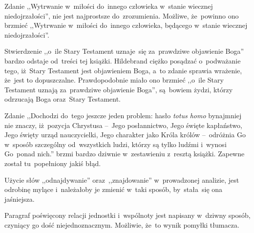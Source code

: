 \documentclass[a4paper,11pt]{article}
\begin{document}
\vspace{\spaceTwo}








\start {} Zdanie ,,Wytrwanie w~miłości do~innego człowieka
w~stanie wiecznej niedojrzałości'', nie jest najprostsze
do~zrozumienia. Możliwe, że~powinno ono brzmieć ,,Wytrwanie w~miłości
do~innego człowieka, będącego w~stanie wiecznej niedojrzałości''.

\vspace{\spaceFour}


\start {} Stwierdzenie ,,o~ile Stary Testament uznaje~się
za~prawdziwe objawienie Boga'' bardzo odstaje od~treści tej książki.
Hildebrand ciężko posądzać o~podważanie tego, iż~Stary Testament jest
objawieniem Boga, a~to zdanie sprawia wrażenie, że~jest to
dopuszczalne. Prawdopodobnie miało ono brzmieć ,,o~ile Stary Testament
uznają za~prawdziwe objawienie Boga'', są~bowiem żydzi, którzy
odrzucają Boga oraz~Stary Testament.

\vspace{\spaceFour}


\start {} Zdanie ,,Dochodzi do~tego jeszcze jeden problem:
hasło \emph{totus homo} bynajmniej nie znaczy, iż~pozycja Chrystusa
--~Jego posłannictwo, Jego święte kapłaństwo, Jego święty urząd
nauczycielki, Jego charakter jako Króla królów --~odróżnia Go w~sposób
szczególny od~wszystkich ludzi, którzy są tylko ludźmi i~wynosi
Go~ponad nich.'' brzmi bardzo dziwnie w~zestawieniu z~resztą książki.
Zapewne został tu~popełniony jakiś błąd.

\vspace{\spaceFour}


\start {} Użycie słów ,,odnajdywanie'' oraz~,,znajdowanie''
w~prowadzonej analizie, jest odrobinę mylące i~należałoby je zmienić
w~taki sposób, by~stała~się ona jaśniejsza.

\vspace{\spaceFour}


\start {} Paragraf poświęcony relacji jednostki i~wspólnoty
jest napisany w~dziwny sposób, czyniący go dość niejednoznacznym.
Możliwie, że~to wynik pomyłki tłumacza.

\vspace{\spaceFour}
\end{document}
